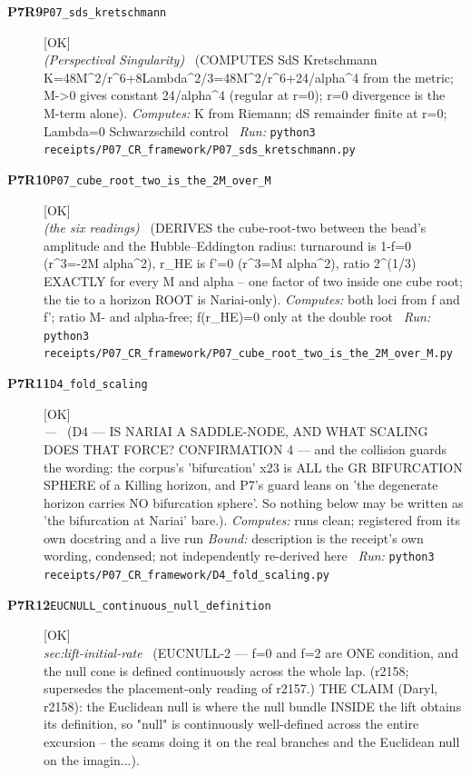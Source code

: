 \begin{description}
\item[\textbf{P7R9}\quad\texttt{P07\_sds\_kretschmann}]\hfill\textsf{[OK]}\\
\textit{(Perspectival Singularity)} \ (COMPUTES SdS Kretschmann K=48M\textasciicircum{}2/r\textasciicircum{}6+8Lambda\textasciicircum{}2/3=48M\textasciicircum{}2/r\textasciicircum{}6+24/alpha\textasciicircum{}4 from the metric; M->0 gives constant 24/alpha\textasciicircum{}4 (regular at r=0); r=0 divergence is the M-term alone). 
\emph{Computes:} K from Riemann; dS remainder finite at r=0; Lambda=0 Schwarzschild control
\ \emph{Run:} \texttt{python3 receipts/P07\_CR\_framework/P07\_sds\_kretschmann.py}
\item[\textbf{P7R10}\quad\texttt{P07\_cube\_root\_two\_is\_the\_2M\_over\_M}]\hfill\textsf{[OK]}\\
\textit{(the six readings)} \ (DERIVES the cube-root-two between the bead's amplitude and the Hubble--Eddington radius: turnaround is 1-f=0 (r\textasciicircum{}3=-2M alpha\textasciicircum{}2), r\_HE is f'=0 (r\textasciicircum{}3=M alpha\textasciicircum{}2), ratio 2\textasciicircum{}(1/3) EXACTLY for every M and alpha -- one factor of two inside one cube root; the tie to a horizon ROOT is Nariai-only). 
\emph{Computes:} both loci from f and f'; ratio M- and alpha-free; f(r\_HE)=0 only at the double root
\ \emph{Run:} \texttt{python3 receipts/P07\_CR\_framework/P07\_cube\_root\_two\_is\_the\_2M\_over\_M.py}
\item[\textbf{P7R11}\quad\texttt{D4\_fold\_scaling}]\hfill\textsf{[OK]}\\
\textit{---} \ (D4 --- IS NARIAI A SADDLE-NODE, AND WHAT SCALING DOES THAT FORCE? CONFIRMATION 4 --- and the collision guards the wording: the corpus's 'bifurcation' x23 is ALL the GR BIFURCATION SPHERE of a Killing horizon, and P7's guard leans on 'the degenerate horizon carries NO bifurcation sphere'. So nothing below may be written as 'the bifurcation at Nariai' bare.). 
\emph{Computes:} runs clean; registered from its own docstring and a live run
 \emph{Bound:} description is the receipt's own wording, condensed; not independently re-derived here
\ \emph{Run:} \texttt{python3 receipts/P07\_CR\_framework/D4\_fold\_scaling.py}
\item[\textbf{P7R12}\quad\texttt{EUCNULL\_continuous\_null\_definition}]\hfill\textsf{[OK]}\\
\textit{sec:lift-initial-rate} \ (EUCNULL-2 --- f=0 and f=2 are ONE condition, and the null cone is defined continuously across the whole lap. (r2158; supersedes the placement-only reading of r2157.) THE CLAIM (Daryl, r2158): the Euclidean null is where the null bundle INSIDE the lift obtains its definition, so "null" is continuously well-defined across the entire excursion -- the seams doing it on the real branches and the Euclidean null on the imagin...). 

\end{description}
